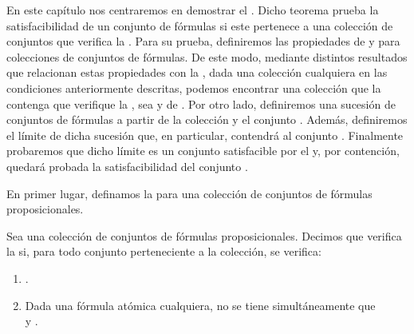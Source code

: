 %
\begin{isabellebody}%
%
%
\isadelimtheory
%
\endisadelimtheory
%
\isatagtheory
%
\endisatagtheory
{\isafoldtheory}%
%
\isadelimtheory
%
\endisadelimtheory
%
\begin{isamarkuptext}%
En este capítulo nos centraremos en demostrar el .
  Dicho teorema prueba la satisfacibilidad de un conjunto de fórmulas  si este pertenece a una 
  colección de conjuntos  que verifica la . Para su 
  prueba, definiremos las propiedades de  y  para
  colecciones de conjuntos de fórmulas. De este modo, mediante distintos resultados que relacionan
  estas propiedades con la , dada una colección  
  cualquiera en las condiciones anteriormente descritas, podemos encontrar una colección  que la 
  contenga que verifique la , sea  y de . Por otro lado, definiremos una sucesión de conjuntos de
  fórmulas a partir de la colección  y el conjunto . Además, definiremos el límite de dicha
  sucesión que, en particular, contendrá al conjunto . Finalmente probaremos que dicho límite es 
  un conjunto satisfacible por el  y, por contención, quedará probada la 
  satisfacibilidad del conjunto .%
\end{isamarkuptext}\isamarkuptrue%
%
\begin{isamarkuptext}%
En primer lugar, definamos la  para una colección 
  de conjuntos de fórmulas proposicionales.%
\end{isamarkuptext}\isamarkuptrue%
%
\begin{isamarkuptext}%
\begin{definicion}
    Sea  una colección de conjuntos de fórmulas proposicionales. Decimos que
     verifica la  si, para todo
    conjunto  perteneciente a la colección, se verifica:
    \begin{enumerate}
      \item {}.
      \item Dada  una fórmula atómica cualquiera, no se tiene 
        simultáneamente que\\  y .

\end{enumerate}
\end{definicion}
\end{isamarkuptext}
\end{isabellebody}

